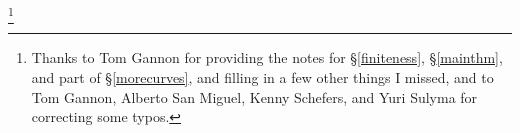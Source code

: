 \author{Arun Debray}
\date{\today}
\email{\MyEmail}
\thanks{Thanks to Tom Gannon for providing the notes for \S\ref{finiteness}, \S\ref{mainthm}, and part of
\S\ref{morecurves}, and filling in a few other things I missed, and to Tom Gannon, Alberto San Miguel, Kenny
Schefers, and Yuri Sulyma for correcting some typos.}


\usepackage{afterpage}
\usepackage{tikz}
\usetikzlibrary{hobby}
\usepackage{lmodern}
\usepackage[T1]{fontenc}
\theoremstyle{theorem}
\newtheorem{conj}[equation]{Conjecture}
\theoremstyle{definition}
\newtheorem{quotdefn}[equation]{``Definition''}


\newcommand{\sX}{\mathscr X}
\newcommand{\sK}{\mathscr K}
\newcommand{\sN}{\mathscr N}
\newcommand{\sA}{\mathscr A}
\newcommand{\sB}{\mathscr B}
\newcommand{\scC}{\mathscr C}
\newcommand{\sC}{\mathsf C}
\newcommand{\M}{\mathcal M}
\DeclareMathOperator{\mult}{mult}
\newcommand{\PSU}{\mathrm{PSU}}
\DeclareMathOperator{\stab}{stab}
\DeclareMathOperator{\mon}{mon}
\DeclareMathOperator{\Div}{Div}
\DeclareMathOperator{\PDiv}{PDiv}
\DeclareMathOperator{\Cl}{C\ell}
\DeclareMathOperator{\Pic}{Pic}
\DeclareMathOperator{\Jac}{Jac}
\newcommand{\AJ}{\mathrm{AJ}}
\DeclareMathOperator{\ev}{ev}
\newcommand{\MCG}{\mathrm{MCG}}
\newcommand{\pr}{\mathrm{pr}}
\newcommand{\HP}{\mathbb{HP}}
\newcommand{\FRM}{\mathit{fr}}
\newcommand{\PT}{\mathit{PT}}
\newcommand{\cH}{\mathcal H}
\newcommand{\cE}{\mathcal E}
\DeclareMathOperator{\Conf}{Conf}
\newcommand{\cC}{\mathcal C}
\newcommand{\cI}{\mathcal I}
\newcommand{\cS}{\mathcal S}
\newcommand{\cD}{\mathcal D}
\newcommand{\gr}{\mathrm{gr}}
\newcommand{\SEnd}{\mathrm{SEnd}}
\DeclareMathOperator{\cl}{cl}
\DeclareMathOperator{\Ad}{Ad}
\DeclareMathOperator{\Der}{Der}
\newcommand{\spin}{\mathfrak{spin}}
\newcommand{\fs}{\mathfrak s}
\newcommand{\tnabla}{\widetilde\nabla}
\newcommand{\cB}{\mathcal B}
\newcommand{\cF}{\mathcal F}
\newcommand{\ch}{\mathit{ch}}
\newcommand{\scal}{\mathrm{scal}}
\newcommand{\vol}{\mathrm{vol}}
\newcommand{\fc}{\mathfrak c}
\newcommand{\Cirr}{C^{\mathrm{irr}}}
\newcommand{\Cred}{C^{\mathrm{red}}}
\newcommand{\cW}{\mathcal W}
\newcommand{\Mirr}{\widetilde M_\eta^{\mathrm{irr}}}
\DeclareMathOperator{\Det}{Det}
\newcommand{\sw}{\mathit{sw}}
\newcommand{\cV}{\mathcal V}
\DeclareMathOperator{\Fred}{Fred}
\newcommand{\scan}{\fs_{\mathrm{can}}}
\newcommand{\can}{_{\mathrm{can}}}
\newcommand{\sE}{\mathscr E}
